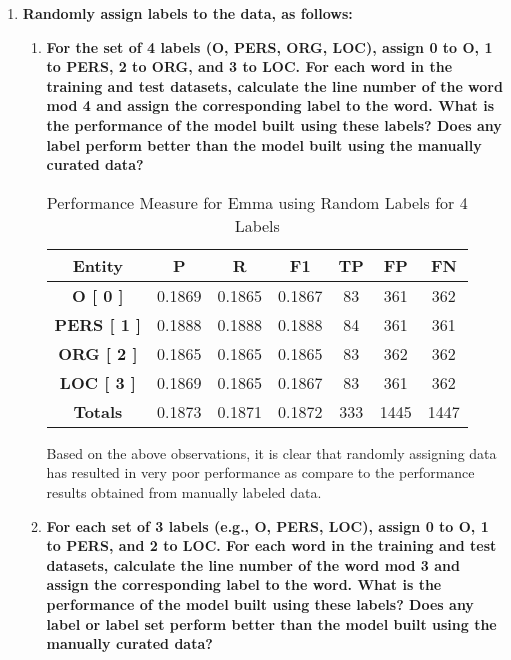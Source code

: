\documentclass[12pt]{article}
\begin{document}
\begin{enumerate}
\begin{enumerate}[label={\alph*.}]
\item \textbf{Randomly assign labels to the data, as follows:}
\begin{enumerate}[label={\roman*.}]
\item \textbf{For the set of 4 labels ({O, PERS, ORG, LOC}), assign 0 to O, 1 to PERS, 2 to ORG, and 3 to LOC. For each word in the training and test datasets, calculate the line number of the word mod 4 and assign the corresponding label to the word. What is the performance of the model built using these labels? Does any label perform better than the model built using the manually curated data?}

\begin{table}[ht!]
\centering
\begin{tabular}{ |c|c|c|c|c|c|c|} 
\hline 
\textbf{Entity} & \textbf{P} & \textbf{R} & \textbf{F1} &\textbf{TP} &\textbf{FP} & \textbf{FN} \\ [2ex]
\hline 
\textbf{O [ 0 ]} & 0.1869 & 0.1865 & 0.1867 & 83 & 361 & 362\\ [1ex]
\hline 
\textbf{PERS [ 1 ]} & 0.1888 & 0.1888 & 0.1888 & 84 & 361 & 361\\ [1ex]
\hline
\textbf{ORG [ 2 ]} & 0.1865 & 0.1865 & 0.1865  & 83 & 362 & 362\\  [1ex]
\hline
\textbf{LOC [ 3 ]} & 0.1869 & 0.1865 & 0.1867 & 83 & 361 & 362\\ [1ex]
\hline
\textbf{Totals} & 0.1873 & 0.1871 & 0.1872 & 333 & 1445 & 1447 \\  [1ex]

\hline
\end{tabular}
\caption{Performance Measure for Emma using Random Labels for 4 Labels}
\label{table:11}
\end{table}
Based on the above observations, it is clear that randomly assigning data has resulted in very poor performance as compare to the performance results obtained from manually labeled data.\\

\item  \textbf{For each set of 3 labels (e.g., {O, PERS, LOC}), assign 0 to O, 1 to PERS, and 2 to LOC. For each word in the training and test datasets, calculate the line number of the word mod 3 and assign the corresponding label to the word. What is the performance of the model built using these labels? Does any label or label set perform better than the model built using the manually curated data?}


\end{enumerate}
\end{enumerate}
\end{enumerate}
\end{document}
